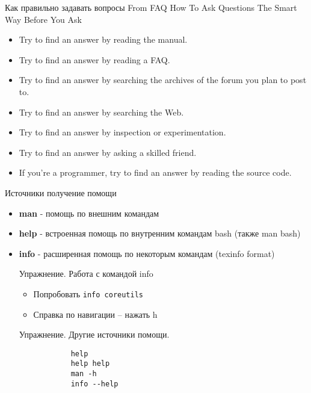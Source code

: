 
\begin{frame}[fragile]{Как правильно задавать вопросы}
From FAQ How To Ask Questions The Smart Way
Before You Ask
  \begin{itemize}
	  \item Try to find an answer by reading the manual.
	  \item Try to find an answer by reading a FAQ.
	  \item Try to find an answer by searching the archives of the forum you plan to post to.
	  \item Try to find an answer by searching the Web.
	  \item Try to find an answer by inspection or experimentation.
	  \item Try to find an answer by asking a skilled friend.
	  \item If you're a programmer, try to find an answer by reading the source code.
    \end{itemize}
\end{frame}


\begin{frame}[fragile]{Источники получение помощи}
  \begin{itemize}
    \pause
    \item \textbf{man} - помощь по внешним командам
    \pause
    \item \textbf{help} - встроенная помощь по внутренним командам bash (также man bash)
    \pause
    \item \textbf{info} - расширенная помощь по некоторым командам (texinfo format)
     \begin{block}{Упражнение. Работа с командой info}
        \begin{itemize}
        \item   Попробовать {\tt info coreutils}
        \item   Справка по навигации -- нажать h
        \end{itemize}
	 \end{block}
		\begin{block}{Упражнение. Другие источники помощи.}
			\begin{lstlisting}
            help 
            help help
            man -h
            info --help
			\end{lstlisting}
		\end{block}
  \end{itemize}
\end{frame}

